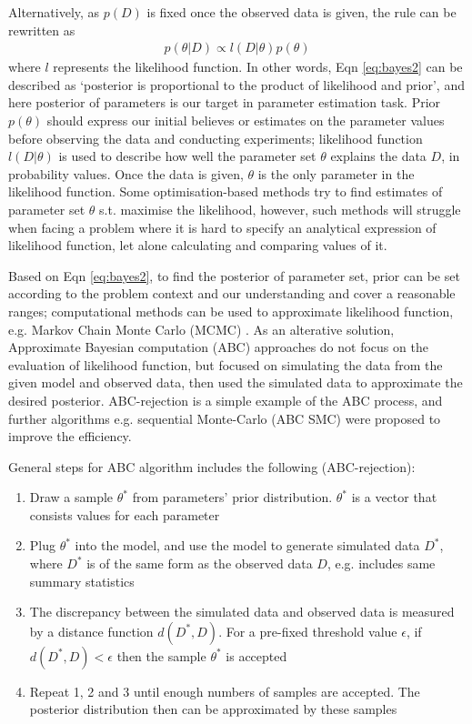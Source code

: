 Alternatively, as $p(D)$ is fixed once the observed data is given, the rule can be rewritten as 
\begin{align}
    \label{eq:bayes2}
    p(\theta|D) \propto l(D|\theta)p(\theta)
\end{align}
where $l$ represents the likelihood function. In other words, Eqn \ref{eq:bayes2} can be described as `posterior is proportional to the product of likelihood and prior', and here posterior of parameters is our target in parameter estimation task. Prior $p(\theta)$ should express our initial believes or estimates on the parameter values before observing the data and conducting experiments; likelihood function $l(D|\theta)$ is used to describe how well the parameter set $\theta$ explains the data $D$, in probability values. Once the data is given, $\theta$ is the only parameter in the likelihood function. Some optimisation-based methods try to find estimates of parameter set $\theta$ s.t. maximise the likelihood, however, such methods will struggle when facing a problem where it is hard to specify an analytical expression of likelihood function, let alone calculating and comparing values of it.

Based on Eqn \ref{eq:bayes2}, to find the posterior of parameter set, prior can be set according to the problem context and our understanding and cover a reasonable ranges; computational methods can be used to approximate likelihood function, e.g. Markov Chain Monte Carlo (MCMC) \cite{ref:MCMC}. As an alterative solution, Approximate Bayesian computation (ABC) approaches do not focus on the evaluation of likelihood function, but focused on simulating the data from the given model and observed data, then used the simulated data to approximate the desired posterior. ABC-rejection \cite{ABC_rejection} is a simple example of the ABC process, and further algorithms e.g. sequential Monte-Carlo (ABC SMC)\cite{Toni} were proposed to improve the efficiency.

General steps for ABC algorithm includes the following (ABC-rejection):

\begin{enumerate}
    \item Draw a sample $\theta^*$ from parameters' prior distribution. $\theta^*$ is a vector that consists values for each parameter
    \item Plug $\theta^*$ into the model, and use the model to generate simulated data $D^*$, where $D^*$ is of the same form as the observed data $D$, e.g. includes same summary statistics
    \item The discrepancy between the simulated data and observed data is measured by a distance function $d(D^*, D)$. For a pre-fixed threshold value $\epsilon$, if $d(D^*, D)<\epsilon$ then the sample $\theta^*$ is accepted
    \item Repeat 1, 2 and 3 until enough numbers of samples are accepted. The posterior distribution then can be approximated by these samples
\end{enumerate}

